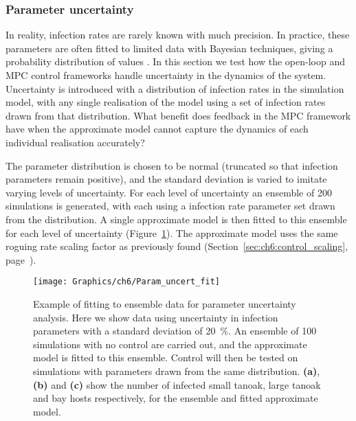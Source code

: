 \subsubsection{Parameter uncertainty}

In reality, infection rates are rarely known with much precision. In practice, these parameters are often fitted to limited data with Bayesian techniques, giving a probability distribution of values \citep[e.g.][]{kleczkowski_parameter_2007, parry_bayesian_2014}. In this section we test how the open-loop and MPC control frameworks handle uncertainty in the dynamics of the system. Uncertainty is introduced with a distribution of infection rates in the simulation model, with any single realisation of the model using a set of infection rates drawn from that distribution. What benefit does feedback in the MPC framework have when the approximate model cannot capture the dynamics of each individual realisation accurately?

The parameter distribution is chosen to be normal (truncated so that infection parameters remain positive), and the standard deviation is varied to imitate varying levels of uncertainty. For each level of uncertainty an ensemble of 200 simulations is generated, with each using a infection rate parameter set drawn from the distribution. A single approximate model is then fitted to this ensemble for each level of uncertainty (Figure~\ref{fig:ch6:param_uncert_fit}). The approximate model uses the same roguing rate scaling factor as previously found (Section~\ref{sec:ch6:control_scaling}, page~\pageref{sec:ch6:control_scaling}).

\begin{figure}[t]
    \begin{center}
        \texttt{[image: Graphics/ch6/Param\_uncert\_fit]}
        \caption[Ensemble fitting under parameter uncertainty]{Example of fitting to ensemble data for parameter uncertainty analysis. Here we show data using uncertainty in infection parameters with a standard deviation of \SI{20}{\percent}. An ensemble of 100 simulations with no control are carried out, and the approximate model is fitted to this ensemble. Control will then be tested on simulations with parameters drawn from the same distribution. \textbf{(a)}, \textbf{(b)} and \textbf{(c)} show the number of infected small tanoak, large tanoak and bay hosts respectively, for the ensemble and fitted approximate model.\label{fig:ch6:param_uncert_fit}}
    \end{center}
\end{figure}

